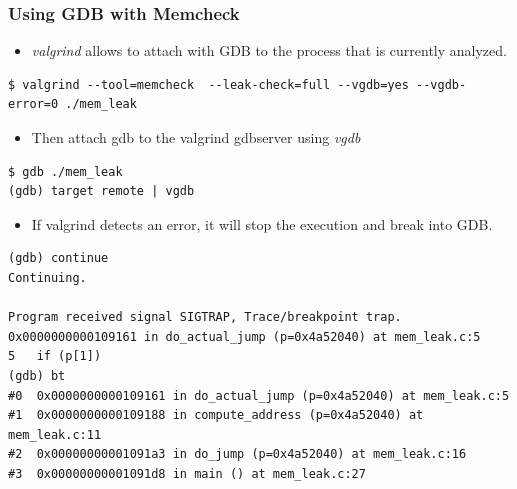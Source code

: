\begin{frame}[fragile]
  \frametitle{Using GDB with Memcheck}
  \begin{itemize}
    \item {\em valgrind} allows to attach with GDB to the process that is
          currently analyzed.
  \end{itemize}
  \begin{block}{}
    \begin{verbatim}
$ valgrind --tool=memcheck  --leak-check=full --vgdb=yes --vgdb-error=0 ./mem_leak
    \end{verbatim}
  \end{block}

  \begin{itemize}
    \item Then attach gdb to the valgrind gdbserver using {\em vgdb}
  \end{itemize}
  \begin{block}{}
    \begin{verbatim}
$ gdb ./mem_leak
(gdb) target remote | vgdb
    \end{verbatim}
  \end{block}

  \begin{itemize}
    \item If valgrind detects an error, it will stop the execution and break
          into GDB.
  \end{itemize}

  \begin{block}{}
    \begin{verbatim}
(gdb) continue
Continuing.

Program received signal SIGTRAP, Trace/breakpoint trap.
0x0000000000109161 in do_actual_jump (p=0x4a52040) at mem_leak.c:5
5   if (p[1])
(gdb) bt
#0  0x0000000000109161 in do_actual_jump (p=0x4a52040) at mem_leak.c:5
#1  0x0000000000109188 in compute_address (p=0x4a52040) at mem_leak.c:11
#2  0x00000000001091a3 in do_jump (p=0x4a52040) at mem_leak.c:16
#3  0x00000000001091d8 in main () at mem_leak.c:27
    \end{verbatim}
  \end{block}
\end{frame}

